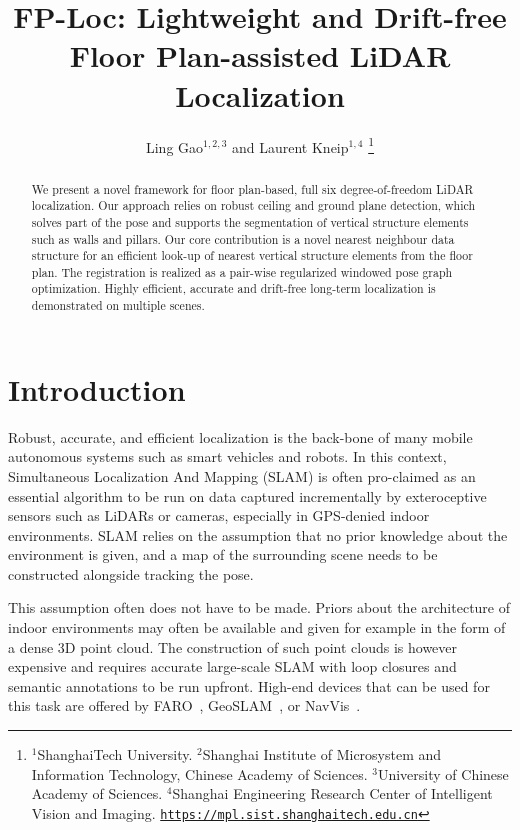 \documentclass[letterpaper, 10 pt, conference]{ieeeconf}  %
\title{\LARGE \bf
FP-Loc: Lightweight and Drift-free \\ Floor Plan-assisted LiDAR Localization
}
\author{Ling Gao$^{1,2,3}$ and Laurent Kneip$^{1,4}$%
\thanks{$^{1}$ShanghaiTech University. $^{2}$Shanghai Institute of Microsystem and Information Technology, Chinese Academy of Sciences. $^{3}$University of Chinese Academy of Sciences. $^{4}$Shanghai Engineering Research Center of Intelligent Vision and Imaging. \tt\url{https://mpl.sist.shanghaitech.edu.cn}}%
}
\begin{document}
\maketitle
\thispagestyle{empty}
\pagestyle{empty}


\begin{abstract}
We present a novel framework for floor plan-based, full six degree-of-freedom LiDAR localization. Our approach relies on robust ceiling and ground plane detection, which solves part of the pose and supports the segmentation of vertical structure elements such as walls and pillars. Our core contribution is a novel nearest neighbour data structure for an efficient look-up of nearest vertical structure elements from the floor plan. The registration is realized as a pair-wise regularized windowed pose graph optimization. Highly efficient, accurate and drift-free long-term localization is demonstrated on multiple scenes.
\end{abstract}


\section{Introduction}

Robust, accurate, and efficient localization is the back-bone of many mobile autonomous systems such as smart vehicles and robots. In this context, Simultaneous Localization And Mapping (SLAM) is often pro-claimed as an essential algorithm to be run on data captured incrementally by exteroceptive sensors such as LiDARs or cameras, especially in GPS-denied indoor environments. SLAM relies on the assumption that no prior knowledge about the environment is given, and a map of the surrounding scene needs to be constructed alongside tracking the pose.

This assumption often does not have to be made. Priors about the architecture of indoor environments may often be available and given for example in the form of a dense 3D point cloud. The construction of such point clouds is however expensive and requires accurate large-scale SLAM with loop closures and semantic annotations to be run upfront. High-end devices that can be used for this task are offered by FARO~\cite{faro}, GeoSLAM~\cite{geoslam}, or NavVis~\cite{navvis}.
\end{document}
